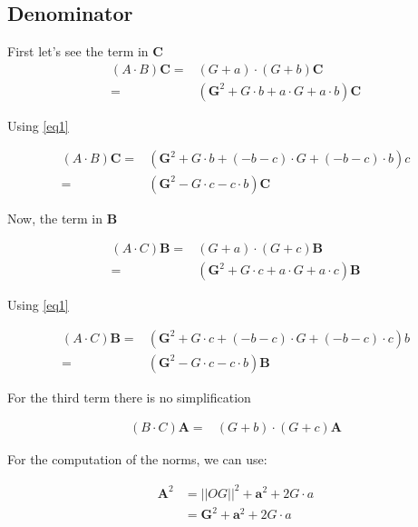 \documentclass[10pt,a4paper]{article}
\begin{document}
\subsection{Denominator}


First let's see the term in $\mathbf{C}$
\begin{align*}
 \left({A}\cdot {B}\right)\mathbf{C}
	=& \left( G + a \right) \cdot \left( G + b \right) \mathbf{C} \\
	 =& (\mathbf{G}^2 +  G \cdot b	+ a \cdot G + a \cdot b    ) \mathbf{C}
\end{align*}

Using \eqref{eq1}

\begin{align}
 \left({A}\cdot {B}\right)\mathbf{C}
	 =& (\mathbf{G}^2 +  G \cdot b	+ (-b - c) \cdot G + (-b - c) \cdot b    ) c \nonumber \\
	 =& (\mathbf{G}^2 - G \cdot c - c \cdot b)\mathbf{C}
\end{align}



Now, the term in $\mathbf{B}$


\begin{align*}
 \left({A}\cdot {C}\right)\mathbf{B} 
	=& \left( G + a \right) \cdot \left( G + c \right) \mathbf{B} \\
	 =& (\mathbf{G}^2 +  G \cdot c	+ a \cdot G + a \cdot c    ) \mathbf{B}
\end{align*}

Using \eqref{eq1}

\begin{align}
 \left({A}\cdot {C}\right)\mathbf{B}
	 =& (\mathbf{G}^2 +  G \cdot c	+ (-b - c) \cdot G + (-b - c) \cdot c    ) b \nonumber \\
	 =& (\mathbf{G}^2 - G \cdot c - c \cdot b)\mathbf{B}
\end{align}


For the third term there is no simplification

\begin{align}
 \left({B}\cdot {C}\right)\mathbf{A}
	=& \left( G + b \right) \cdot \left( G + c \right) \mathbf{A}
\end{align}


For the computation of the norms, we can use:

\begin{align*}
\mathbf{A}^2 &= ||OG||^2 + \mathbf{a}^2 + 2 G \cdot a \\
        &=  \mathbf{G}^2 + \mathbf{a}^2 + 2 G \cdot a 
\end{align*}
\end{document}
